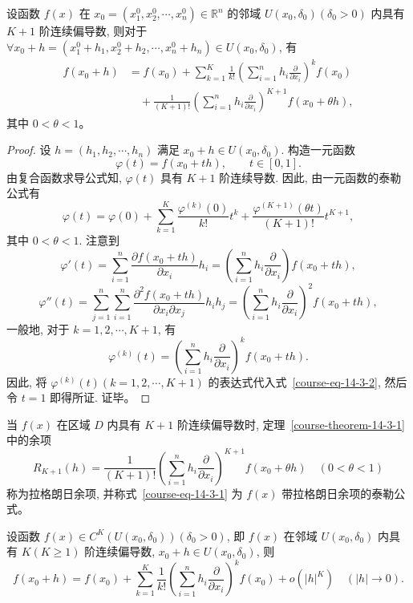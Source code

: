 \documentclass[12pt,fontset=fandol]{ctexart}
\begin{document}
\begin{theorem}[泰勒公式]\label{course-theorem-14-3-1}\quad 设函数 $f(x)$ 在 $x_0=(x_1^0,x_2^0,\cdots,x_n^0)\in\mathbb R^n$ 的邻域 $U(x_0,\delta_0)(\delta_0>0)$ 内具有 $K+1$ 阶连续偏导数, 则对于 $\forall x_0+h=(x_1^0+h_1,x_2^0+h_2,\cdots,x_n^0+h_n)\in U(x_0,\delta_0)$, 有
\begin{equation}
\begin{aligned}
  f(x_0+h)
  &=f(x_0)+\sum_{k=1}^K\frac1{k!}
  \left(\sum_{i=1}^n h_i\frac{\partial}{\partial x_i}\right)^k f(x_0)\\
  &\quad+\frac1{(K+1)!}
  \left(\sum_{i=1}^n h_i\frac{\partial}{\partial x_i}\right)^{K+1}
  f(x_0+\theta h),
\end{aligned}
\label{course-eq-14-3-1}
\end{equation}
其中 $0<\theta<1$。

\end{theorem}
\begin{proof}\quad 设 $h=(h_1,h_2,\cdots,h_n)$ 满足 $x_0+h\in U(x_0,\delta_0)$. 构造一元函数
\[
  \varphi(t)=f(x_0+th),\qquad t\in[0,1].
\]
由复合函数求导公式知, $\varphi(t)$ 具有 $K+1$ 阶连续导数. 因此, 由一元函数的泰勒公式有
\begin{equation}
  \varphi(t)=\varphi(0)+\sum_{k=1}^K
  \frac{\varphi^{(k)}(0)}{k!}t^k
  +\frac{\varphi^{(K+1)}(\theta t)}{(K+1)!}t^{K+1},
  \label{course-eq-14-3-2}
\end{equation}
其中 $0<\theta<1$. 注意到
\[
  \varphi'(t)=\sum_{i=1}^n\frac{\partial f(x_0+th)}{\partial x_i}h_i
  =\left(\sum_{i=1}^n h_i\frac{\partial}{\partial x_i}\right)f(x_0+th),
\]
\[
  \varphi''(t)=\sum_{j=1}^n\sum_{i=1}^n
  \frac{\partial^2 f(x_0+th)}{\partial x_i\partial x_j}h_ih_j
  =\left(\sum_{i=1}^n h_i\frac{\partial}{\partial x_i}\right)^2 f(x_0+th),
\]
一般地, 对于 $k=1,2,\cdots,K+1$, 有
\[
  \varphi^{(k)}(t)
  =\left(\sum_{i=1}^n h_i\frac{\partial}{\partial x_i}\right)^k f(x_0+th).
\]
因此, 将 $\varphi^{(k)}(t)(k=1,2,\cdots,K+1)$ 的表达式代入式~\eqref{course-eq-14-3-2}, 然后令 $t=1$ 即得所证. 证毕。

\end{proof}
\begin{remark}\quad 当 $f(x)$ 在区域 $D$ 内具有 $K+1$ 阶连续偏导数时, 定理~\ref{course-theorem-14-3-1}  中的余项
\[
  R_{K+1}(h)=\frac1{(K+1)!}
  \left(\sum_{i=1}^n h_i\frac{\partial}{\partial x_i}\right)^{K+1}f(x_0+\theta h)
  \quad(0<\theta<1)
\]
称为拉格朗日余项, 并称式~\eqref{course-eq-14-3-1}  为 $f(x)$ 带拉格朗日余项的泰勒公式。

\end{remark}
\noindent{}\quad 设函数 $f(x)\in C^K(U(x_0,\delta_0))(\delta_0>0)$, 即 $f(x)$ 在邻域 $U(x_0,\delta_0)$ 内具有 $K(K\geqslant1)$ 阶连续偏导数, $x_0+h\in U(x_0,\delta_0)$, 则
\begin{equation}
  f(x_0+h)=f(x_0)+\sum_{k=1}^K\frac1{k!}
  \left(\sum_{i=1}^n h_i\frac{\partial}{\partial x_i}\right)^k f(x_0)
  +o(|h|^K)
  \quad(|h|\to0).
  \label{course-eq-14-3-3}
\end{equation}
\end{document}
